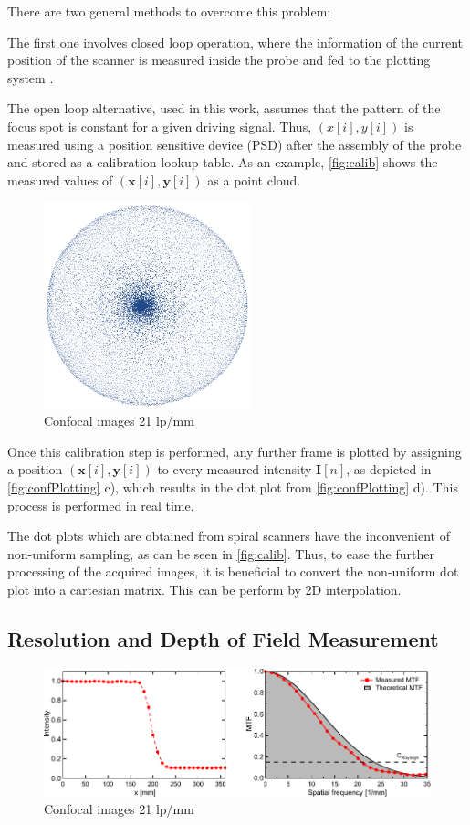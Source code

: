 There are two general methods to overcome this problem:

The first one involves closed loop operation, where the information of the current position of the scanner is measured inside the probe and fed to the plotting system \cite{Yeoh2014}. 

The open loop alternative, used in this work, assumes that the pattern of the focus spot is constant for a given driving signal. Thus, $(x[i], y[i])$ is measured using a position sensitive device (PSD) after the assembly of the probe and stored as a calibration lookup table. As an example, \autoref{fig:calib} shows the measured values of $(\mathbf{x}[i], \mathbf{y}[i])$ as a point cloud. 
\begin{figure}[h!]\centering \includegraphics[width=6cm]{figures/50_Measurements/conf/proc/samplingDensity.png}
      \caption{Confocal images 21 lp/mm}
      \label{fig:calib}
\end{figure}
Once this calibration step is performed, any further frame is plotted by assigning a position $(\mathbf{x}[i], \mathbf{y}[i])$ to every measured intensity $\mathbf{I}[n]$, as depicted in \autoref{fig:confPlotting} c), which results in the dot plot from \autoref{fig:confPlotting} d). This process is performed in real time.

The dot plots which are obtained from spiral scanners have the inconvenient of non-uniform sampling, as can be seen in \autoref{fig:calib}. Thus, to ease the further processing of the acquired images, it is beneficial to convert the non-uniform dot plot into a cartesian matrix. This can be perform by 2D interpolation.

\subsection{Resolution and Depth of Field Measurement}

\begin{figure}[h!]\centering \includegraphics{figures/50_Measurements/conf/res/confResMeas.pdf}
      \caption{Confocal images 21 lp/mm}
\end{figure}

